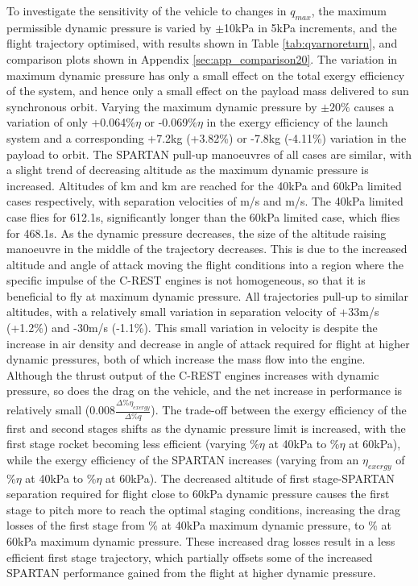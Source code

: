 To investigate the sensitivity of the vehicle to changes in $q_{max}$, the maximum permissible dynamic pressure is varied by $\pm$10kPa in 5kPa increments, and the flight trajectory optimised, with results shown in Table \ref{tab:qvarnoreturn}, and comparison plots shown in Appendix \ref{sec:app_comparison20}.
The variation in maximum dynamic pressure has only a small effect on the total exergy efficiency of the system, and hence only a small effect on the payload mass delivered to sun synchronous orbit.  Varying the maximum dynamic pressure by $\pm20\%$ causes a variation of only +0.064\%$\eta$ or -0.069\%$\eta$ in the exergy efficiency of the launch system and a corresponding +7.2kg (+3.82\%) or -7.8kg (-4.11\%) variation in the payload to orbit.  
The SPARTAN pull-up manoeuvres of all cases are similar, with a slight trend of decreasing altitude as the maximum dynamic pressure is increased. Altitudes of \secondthirdSeparationAltqFortyNoReturn km and \secondthirdSeparationAltqSixtyNoReturn km are reached for the 40kPa and 60kPa limited cases respectively, with separation velocities of \secondthirdSeparationvqFortyNoReturn m/s and \secondthirdSeparationvqSixtyNoReturn m/s. The 40kPa limited case flies for 612.1s, significantly longer than the 60kPa limited case, which flies for 468.1s.
As the dynamic pressure decreases, the size of the altitude raising manoeuvre in the middle of the trajectory decreases. This is due to the increased altitude and angle of attack moving the flight conditions into a region where the specific impulse of the C-REST engines is not homogeneous, so that it is beneficial to fly at maximum dynamic pressure.  
All trajectories pull-up to similar altitudes, with a relatively small variation in separation velocity of +33m/s (+1.2\%) and -30m/s (-1.1\%).
This small variation in velocity is despite the increase in air density and decrease in angle of attack required for flight at higher dynamic pressures, both of which increase the mass flow into the engine. Although the thrust output of the C-REST engines increases with dynamic pressure, so does the drag on the vehicle, and the net increase in performance is relatively small (0.008$ \frac{\Delta\%\eta_{exergy}}{\Delta\%q}$). 
The trade-off between the exergy efficiency of the first and second stages shifts as the dynamic pressure limit is increased, with the first stage rocket becoming less efficient (varying \firstExergyEffqFortyNoReturn\%$\eta$ at 40kPa to \firstExergyEffqSixtyNoReturn\%$\eta$ at 60kPa), while the exergy efficiency of the SPARTAN increases (varying from an $\eta_{exergy}$ of \secondExergyEffqFortyNoReturn\%$\eta$ at 40kPa to \secondExergyEffqSixtyNoReturn\%$\eta$ at 60kPa). The decreased altitude of first stage-SPARTAN separation required for flight close to 60kPa dynamic pressure causes the first stage to pitch more to reach the optimal staging conditions, increasing the drag losses of the first stage from  \WDoneqFortyNoReturn\% at 40kPa maximum dynamic pressure, to \WDoneqSixtyNoReturn\% at 60kPa maximum dynamic pressure. 
These increased drag losses result in a less efficient first stage trajectory, which partially offsets some of the increased SPARTAN performance gained from the flight at higher dynamic pressure. 



